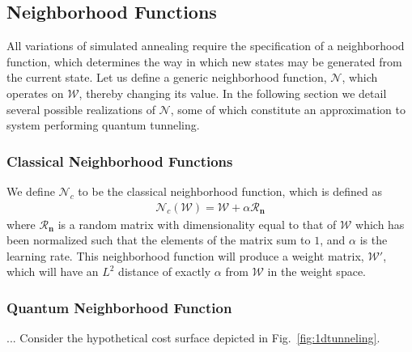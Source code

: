 \documentclass[10pt,journal,cspaper,compsoc]{IEEEtran}
\begin{document}
\subsection{Neighborhood Functions}
\label{scn:neighborhood_methods}


All variations of simulated annealing require the specification of a neighborhood function, which determines the way in which new states may be generated from the current state. 
Let us define a generic neighborhood function, $\mathcal{N}$, which operates on $\boldsymbol{\mathcal{W}}$, thereby changing its value. In the following section we detail several possible realizations of $\mathcal{N}$, some of which constitute an approximation to system performing quantum tunneling.


\subsubsection{Classical Neighborhood Functions}
\label{scn:classical_neighborhood}

We define \begin{math}\mathcal{N}_{c}\end{math} to be the classical neighborhood function, which is defined as \begin{align}\label{eq:classical_neighborhood}
	\mathcal{N}_{c} (\boldsymbol{\mathcal{W}}) = \boldsymbol{\mathcal{W}} + \alpha\boldsymbol{\mathcal{R}_n} 
\end{align}
\noindent where $\boldsymbol{\mathcal{R}_n}$ is a random matrix with dimensionality equal to that of $\boldsymbol{\mathcal{W}}$ which has been normalized such that the elements of the matrix sum to $1$, and $\alpha$ is the learning rate. This neighborhood function will produce a weight matrix, $\boldsymbol{\mathcal{W}'}$, which will have an $L^2$ distance of exactly $\alpha$  from $\boldsymbol{\mathcal{W}}$ in the weight space.

\subsubsection{Quantum Neighborhood Function}
\label{scn:quantum_neighborhood}

... Consider the hypothetical cost surface depicted in Fig.~\ref{fig:1dtunneling}. 
\end{document}
